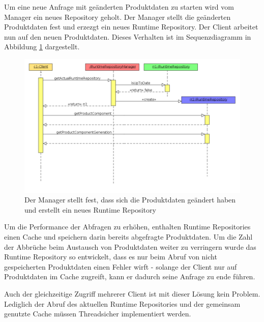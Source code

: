 \documentclass[headsepline=true, footsepline=true]{scrartcl}
\begin{document}
Um eine neue Anfrage mit geänderten Produktdaten zu starten wird vom Manager ein
neues Repository geholt. Der Manager stellt die geänderten Produktdaten
fest und erzezgt ein neues Runtime Repository. Der Client arbeitet nun auf
den neuen Produktdaten. Dieses Verhalten ist
im Sequenzdiagramm in Abbildung \ref{clientSequenceChange} dargestellt.

\begin{figure}[htb] \centering
\includegraphics[width=\textwidth]{./pics/clientSequenceChange.png} \caption{Der
Manager stellt fest, dass sich die Produktdaten geändert haben und erstellt ein
neues Runtime Repository}
\label{clientSequenceChange}
\end{figure}

Um die Performance der Abfragen zu erhöhen, enthalten Runtime Repositories einen
Cache und speichern darin bereits abgefragte Produktdaten. Um die Zahl der
Abbrüche beim Austausch von Produktdaten weiter zu verringern wurde das Runtime
Repository so entwickelt, dass es nur beim Abruf von nicht gespeicherten
Produktdaten einen Fehler wirft - solange der Client nur auf Produktdaten im
Cache zugreift, kann er dadurch seine Anfrage zu ende führen.

Auch der gleichzeitige Zugriff mehrerer Client ist mit dieser Lösung kein
Problem. Lediglich der Abruf des aktuellen Runtime Repositories und der gemeinsam
genutzte Cache müssen Threadsicher implementiert werden.
\end{document}
